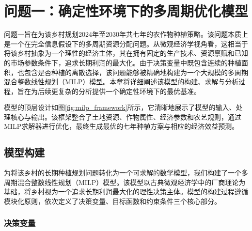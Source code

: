 \section{问题一：确定性环境下的多周期优化模型}

问题一旨在为该乡村规划2024年至2030年共七年的农作物种植策略。该问题本质上是一个在完全信息假设下的多周期资源分配问题。从微观经济学视角看，这相当于将该乡村抽象为一个理性的经济主体，其在拥有固定的生产技术、资源禀赋和已知的市场参数条件下，追求长期利润的最大化。由于决策变量中既包含连续的种植面积，也包含是否种植的离散选择，该问题能够被精确地构建为一个大规模的多周期混合整数线性规划（MILP）模型。本章将详细阐述该模型的构建、求解与分析过程，旨在为后续更复杂的分析提供一个确定性环境下的最优基准。

模型的顶层设计如图\ref{fig:milp_framework}所示，它清晰地展示了模型的输入、处理核心与输出。该框架整合了土地资源、作物属性、经济参数和农艺规则，通过MILP求解器进行优化，最终生成最优的七年种植方案与相应的经济效益预测。


\subsection{模型构建}


为将该乡村的长期种植规划问题转化为一个可求解的数学模型，我们构建了一个多周期混合整数线性规划（MILP）模型。该模型以古典微观经济学中的厂商理论为基础，将乡村视为一个追求长期利润最大化的理性决策主体。模型的构建过程遵循模块化原则，依次定义了决策变量、目标函数和约束条件三个核心部分。

\subsubsection{决策变量}

